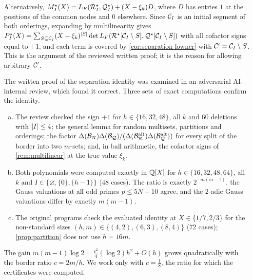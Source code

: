 \begin{remark}\label{rem:multilinear}
Alternatively, $M^\star_I(X)=L_F(\mathcal{R}^\star_I,\mathcal{Q}^\star_I)+(X-\xi_k)D$, where $D$ has entries $1$
at the positions of the common nodes and $0$ elsewhere. Since $\mathcal{C}_I$ is an initial segment of
both orderings, expanding by multilinearity gives
$P^\star_I(X)=\sum_{S\subseteq\mathcal{C}_I}(X-\xi_k)^{\lvert S\rvert}\det L_F(\mathcal{R}^\star[\mathcal{C}_I\setminus S],
\mathcal{Q}^\star[\mathcal{C}_I\setminus S])$ with all cofactor signs equal to $+1$, and each term is covered
by \cref{cor:separation-lowner} with $\mathcal{C}'=\mathcal{C}_I\setminus S$. This is the argument of the
reviewed written proof; it is the reason for allowing arbitrary $\mathcal{C}'$.
\end{remark}

\begin{remark}\label{rem:separation-checks}
The written proof of the separation identity was examined in an adversarial AI-internal review,
which found it correct. Three sets of exact computations confirm the identity.
\begin{enumerate}[(a)]
  \item The review checked the sign $+1$ for $h\in\{16,32,48\}$, all $k$ and $60$ deletions with
  $\lvert I\rvert\le4$; the general lemma for random multisets, partitions and orderings; the factor
  $\Delta(\mathcal{B}_{\mathcal{R}})\Delta(\mathcal{B}_{\mathcal{Q}})/(\Delta(\mathcal{B}^{\mathrm{alt}}_{\mathcal{R}})\Delta(\mathcal{B}^{\mathrm{alt}}_{\mathcal{Q}}))$ for every
  split of the border into two $m$-sets; and, in ball arithmetic, the cofactor signs of
  \cref{rem:multilinear} at the true value $\xi_k$.
  \item Both polynomials were computed exactly in $\mathbb{Q}[X]$ for $h\in\{16,32,48,64\}$, all $k$ and
  $I\in\{\varnothing,\{0\},\{h-1\}\}$ ($48$ cases). The ratio is exactly $2^{-m(m-1)}$, the Gauss
  valuations at all odd primes $p\le5N+10$ agree, and the $2$-adic Gauss valuations differ by
  exactly $m(m-1)$.
  \item The original programs check the evaluated identity at $X\in\{1/7,2/3\}$ for the
  non-standard sizes $(h,m)\in\{(4,2),(6,3),(8,4)\}$ ($72$ cases); \cref{prop:partition} does not
  use $h=16m$.
\end{enumerate}
\end{remark}

\begin{remark}\label{rem:separation-meaning}
The gain $m(m-1)\log2=\frac{c^2}4(\log2)h^2+O(h)$ grows quadratically with the border ratio
$c=2m/h$. We work only with $c=\frac18$, the ratio for which the certificates were computed.
\end{remark}
